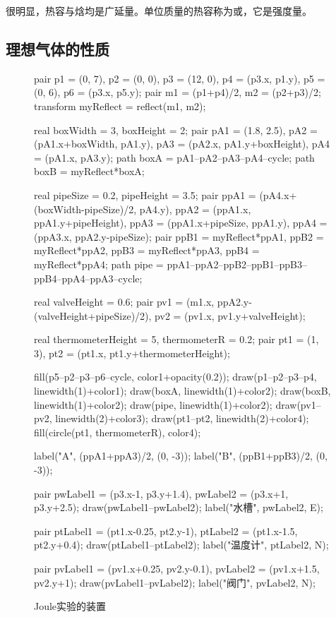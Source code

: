 		很明显，热容与焓均是广延量。单位质量的热容称为或，它是强度量。
		
	\subsection{理想气体的性质} \label{SUBSEC_理想气体的性质}
		\begin{figure}[h]
			\begin{asy}
				pair p1 = (0, 7), p2 = (0, 0), p3 = (12, 0), p4 = (p3.x, p1.y), p5 = (0, 6), p6 = (p3.x, p5.y);
				pair m1 = (p1+p4)/2, m2 = (p2+p3)/2;
				transform myReflect = reflect(m1, m2);
				
				real boxWidth = 3, boxHeight = 2;
				pair pA1 = (1.8, 2.5), pA2 = (pA1.x+boxWidth, pA1.y), pA3 = (pA2.x, pA1.y+boxHeight), pA4 = (pA1.x, pA3.y);
				path boxA = pA1--pA2--pA3--pA4--cycle;
				path boxB = myReflect*boxA;
				
				real pipeSize = 0.2, pipeHeight = 3.5;
				pair ppA1 = (pA4.x+(boxWidth-pipeSize)/2, pA4.y), ppA2 = (ppA1.x, ppA1.y+pipeHeight), ppA3 = (ppA1.x+pipeSize, ppA1.y), ppA4 = (ppA3.x, ppA2.y-pipeSize);
				pair ppB1 = myReflect*ppA1, ppB2 = myReflect*ppA2, ppB3 = myReflect*ppA3, ppB4 = myReflect*ppA4;
				path pipe = ppA1--ppA2--ppB2--ppB1--ppB3--ppB4--ppA4--ppA3--cycle;
				
				real valveHeight = 0.6;
				pair pv1 = (m1.x, ppA2.y-(valveHeight+pipeSize)/2), pv2 = (pv1.x, pv1.y+valveHeight);
				
				real thermometerHeight = 5, thermometerR = 0.2;
				pair pt1 = (1, 3), pt2 = (pt1.x, pt1.y+thermometerHeight);
				
				fill(p5--p2--p3--p6--cycle, color1+opacity(0.2));
				draw(p1--p2--p3--p4, linewidth(1)+color1);
				draw(boxA, linewidth(1)+color2);
				draw(boxB, linewidth(1)+color2);
				draw(pipe, linewidth(1)+color2);
				draw(pv1--pv2, linewidth(2)+color3);
				draw(pt1--pt2, linewidth(2)+color4);
				fill(circle(pt1, thermometerR), color4);
				
				label("A", (ppA1+ppA3)/2, (0, -3));
				label("B", (ppB1+ppB3)/2, (0, -3));
				
				pair pwLabel1 = (p3.x-1, p3.y+1.4), pwLabel2 = (p3.x+1, p3.y+2.5);
				draw(pwLabel1--pwLabel2);
				label("水槽", pwLabel2, E);
				
				pair ptLabel1 = (pt1.x-0.25, pt2.y-1), ptLabel2 = (pt1.x-1.5, pt2.y+0.4);
				draw(ptLabel1--ptLabel2);
				label("温度计", ptLabel2, N);
				
				pair pvLabel1 = (pv1.x+0.25, pv2.y-0.1), pvLabel2 = (pv1.x+1.5, pv2.y+1);
				draw(pvLabel1--pvLabel2);
				label("阀门", pvLabel2, N);
			\end{asy}
			\caption{Joule实验的装置}
			\label{FIG_JOULE_EXPERIMENT}
		\end{figure}
		
